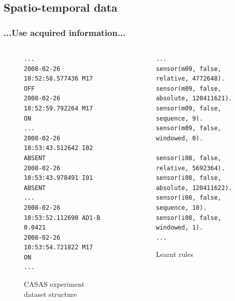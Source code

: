 \documentclass[09pt]{beamer}
\begin{document}
\subsection{Spatio-temporal data}
\begin{frame}[fragile]
\frametitle{...Use acquired information...}
{\tiny
\begin{columns}
\begin{column}{5.4cm}
\begin{example}
\begin{figure}
\lstset{
captionpos=b,
language=HTML,
breaklines=true,
float=tb,
basicstyle=\tiny
}
\begin{lstlisting}
...
2008-02-26 10:52:58.577436 M17   OFF
2008-02-26 10:52:59.792264 M17   ON
...
2008-02-26 10:53:43.512642 I02   ABSENT
2008-02-26 10:53:43.978491 I01   ABSENT
...
2008-02-26 10:53:52.112690 AD1-B 0.0421
2008-02-26 10:53:54.721822 M17   ON
...
\end{lstlisting}
\caption{\tiny CASAS experiment dataset structure\label{lst:data}}
\end{figure}
\end{example}
\end{column}
\pause
\begin{column}{5.4cm}
\begin{example}
\begin{figure}
\lstset{
captionpos=b,
language=HTML,
breaklines=true,
float=tb,
basicstyle=\tiny
}
\begin{lstlisting}
...
sensor(m09, false, relative, 4772648).
sensor(m09, false, absolute, 120411621).
sensor(m09, false, sequence, 9).
sensor(m09, false, windowed, 0).

sensor(i08, false, relative, 5692364).
sensor(i08, false, absolute, 120411622).
sensor(i08, false, sequence, 10).
sensor(i08, false, windowed, 1).
...
\end{lstlisting}
\tiny\caption{\tiny Learnt rules\label{lst:rules}}
\end{figure}
\end{example}
\end{column}
\end{columns}
}
\end{frame}
\end{document}

